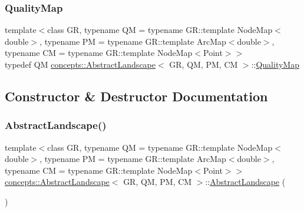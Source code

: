 \mbox{\label{classconcepts_1_1_abstract_landscape_aab540b896ac9b7a7a5783f2a78f304ad}} 
\subsubsection{\texorpdfstring{Quality\+Map}{QualityMap}}
{\footnotesize\ttfamily template$<$class GR, typename QM = typename G\+R\+::template Node\+Map$<$double$>$, typename PM = typename G\+R\+::template Arc\+Map$<$double$>$, typename CM = typename G\+R\+::template Node\+Map$<$\+Point$>$$>$ \\
typedef QM \hyperlink{classconcepts_1_1_abstract_landscape}{concepts\+::\+Abstract\+Landscape}$<$ GR, QM, PM, CM $>$\+::\hyperlink{classconcepts_1_1_abstract_landscape_aab540b896ac9b7a7a5783f2a78f304ad}{Quality\+Map}}



\subsection{Constructor \& Destructor Documentation}
\mbox{\label{classconcepts_1_1_abstract_landscape_a1ef1ebd4c1a2c8fa7db1015c2f3a5ad2}} 
\subsubsection{\texorpdfstring{Abstract\+Landscape()}{AbstractLandscape()}}
{\footnotesize\ttfamily template$<$class GR, typename QM = typename G\+R\+::template Node\+Map$<$double$>$, typename PM = typename G\+R\+::template Arc\+Map$<$double$>$, typename CM = typename G\+R\+::template Node\+Map$<$\+Point$>$$>$ \\
\hyperlink{classconcepts_1_1_abstract_landscape}{concepts\+::\+Abstract\+Landscape}$<$ GR, QM, PM, CM $>$\+::\hyperlink{classconcepts_1_1_abstract_landscape}{Abstract\+Landscape} (\begin{DoxyParamCaption}{ }\end{DoxyParamCaption})\hspace{0.3cm}{\ttfamily [inline]}}

